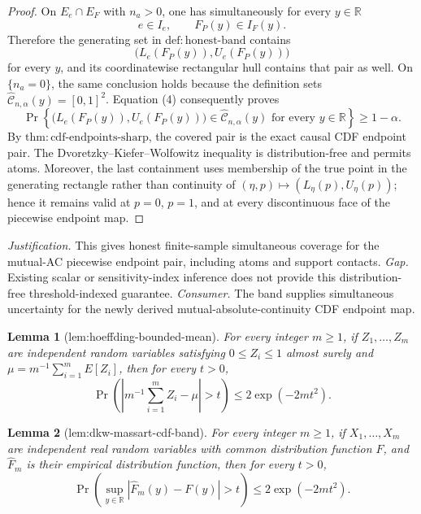 \documentclass{article}
\newtheorem{lemma}{Lemma}
\begin{document}
\begin{proof}
On \(E_e\cap E_F\) with \(n_a>0\), one has simultaneously for every \(y\in\mathbb R\)
\[
 e\in I_e,
 \qquad
 F_P(y)\in I_F(y).
\]
Therefore the generating set in \(\mathrm{def:honest\text{-}band}\) contains
\[
 \bigl(L_e(F_P(y)),U_e(F_P(y))\bigr)
\]
for every \(y\), and its coordinatewise rectangular hull contains that pair as well.  On \(\{n_a=0\}\), the same conclusion holds because the definition sets \(\widehat{\mathcal C}_{n,\alpha}(y)=[0,1]^2\).  Equation (4) consequently proves
\[
 \Pr\left\{
 \bigl(L_e(F_P(y)),U_e(F_P(y))\bigr)
 \in\widehat{\mathcal C}_{n,\alpha}(y)
 \text{ for every }y\in\mathbb R
 \right\}\ge1-\alpha.
\]
By \(\mathrm{thm:cdf\text{-}endpoints\text{-}sharp}\), the covered pair is the exact causal CDF endpoint pair.  The Dvoretzky--Kiefer--Wolfowitz inequality is distribution-free and permits atoms.  Moreover, the last containment uses membership of the true point in the generating rectangle rather than continuity of \((\eta,p)\mapsto(L_\eta(p),U_\eta(p))\); hence it remains valid at \(p=0\), \(p=1\), and at every discontinuous face of the piecewise endpoint map.
\end{proof}
\par\smallskip\noindent \textit{Justification.} This gives honest finite-sample simultaneous coverage for the mutual-AC piecewise endpoint pair, including atoms and support contacts. \textit{Gap.} Existing scalar or sensitivity-index inference does not provide this distribution-free threshold-indexed guarantee. \textit{Consumer.} The band supplies simultaneous uncertainty for the newly derived mutual-absolute-continuity CDF endpoint map.

\begin{lemma}[lem:hoeffding-bounded-mean]\label{lem:hoeffding-bounded-mean}
For every integer \(m\ge1\), if \(Z_1,\ldots,Z_m\) are independent random variables satisfying \(0\le Z_i\le1\) almost surely and \(\mu=m^{-1}\sum_{i=1}^m E[Z_i]\), then for every \(t>0\),
\[
 \Pr\left(\left|m^{-1}\sum_{i=1}^m Z_i-\mu\right|>t\right)\le2\exp(-2mt^2).
\]
\end{lemma}

\begin{lemma}[lem:dkw-massart-cdf-band]\label{lem:dkw-massart-cdf-band}
For every integer \(m\ge1\), if \(X_1,\ldots,X_m\) are independent real random variables with common distribution function \(F\), and \(\widehat F_m\) is their empirical distribution function, then for every \(t>0\),
\[
 \Pr\left(\sup_{y\in\mathbb R}|\widehat F_m(y)-F(y)|>t\right)\le2\exp(-2mt^2).
\]
\end{lemma}
\end{document}
